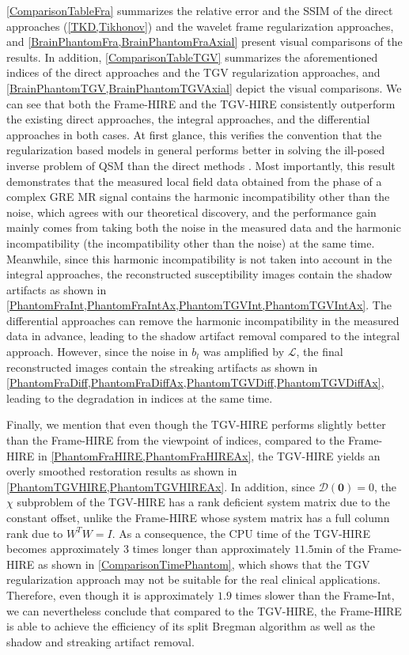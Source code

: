 \documentclass[reqno]{siamonline1116}
\numberwithin{theorem}{section}
\numberwithin{equation}{section}
\def\mD{{\mathcal D}}
\def\msL{{\mathscr L}}
\def\0{{\mathbf 0}}
\begin{document}
\cref{ComparisonTableFra} summarizes the relative error and the SSIM of the direct approaches (\cref{TKD,Tikhonov}) and the wavelet frame regularization approaches, and \cref{BrainPhantomFra,BrainPhantomFraAxial} present visual comparisons of the results. In addition, \cref{ComparisonTableTGV} summarizes the aforementioned indices of the direct approaches and the TGV regularization approaches, and \cref{BrainPhantomTGV,BrainPhantomTGVAxial} depict the visual comparisons. We can see that both the Frame-HIRE and the TGV-HIRE consistently outperform the existing direct approaches, the integral approaches, and the differential approaches in both cases. At first glance, this verifies the convention that the regularization based models in general performs better in solving the ill-posed inverse problem of QSM than the direct methods \cite{Y.Kee2017,S.Wang2013}. Most importantly, this result demonstrates that the measured local field data obtained from the phase of a complex GRE MR signal contains the harmonic incompatibility other than the noise, which agrees with our theoretical discovery, and the performance gain mainly comes from taking both the noise in the measured data and the harmonic incompatibility (the incompatibility other than the noise) at the same time. Meanwhile, since this harmonic incompatibility is not taken into account in the integral approaches, the reconstructed susceptibility images contain the shadow artifacts as shown in \cref{PhantomFraInt,PhantomFraIntAx,PhantomTGVInt,PhantomTGVIntAx}. The differential approaches can remove the harmonic incompatibility in the measured data in advance, leading to the shadow artifact removal compared to the integral approach. However, since the noise in $b_l$ was amplified by $\msL$, the final reconstructed images contain the streaking artifacts as shown in \cref{PhantomFraDiff,PhantomFraDiffAx,PhantomTGVDiff,PhantomTGVDiffAx}, leading to the degradation in indices at the same time.

Finally, we mention that even though the TGV-HIRE performs slightly better than the Frame-HIRE from the viewpoint of indices, compared to the Frame-HIRE in \cref{PhantomFraHIRE,PhantomFraHIREAx}, the TGV-HIRE yields an overly smoothed restoration results as shown in \cref{PhantomTGVHIRE,PhantomTGVHIREAx}. In addition, since $\mD(\0)=0$, the $\chi$ subproblem of the TGV-HIRE has a rank deficient system matrix due to the constant offset, unlike the Frame-HIRE whose system matrix has a full column rank due to $W^TW=I$. As a consequence, the CPU time of the TGV-HIRE becomes approximately $3$ times longer than approximately $11.5\mathrm{min}$ of the Frame-HIRE as shown in \cref{ComparisonTimePhantom}, which shows that the TGV regularization approach may not be suitable for the real clinical applications. Therefore, even though it is approximately $1.9$ times slower than the Frame-Int, we can nevertheless conclude that compared to the TGV-HIRE, the Frame-HIRE is able to achieve the efficiency of its split Bregman algorithm as well as the shadow and streaking artifact removal.
\end{document}
